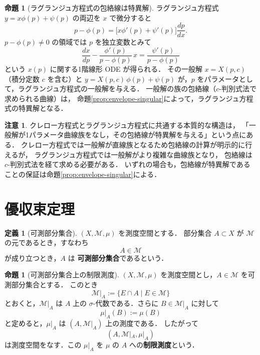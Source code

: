 \documentclass[dvipdfmx,a4paper,12pt]{jsarticle}
\newcommand{\uref}[1]{\hyperref[#1]{\textcolor{TiffanyBlue}{\underline{\ref*{#1}}}}}
\theoremstyle{definition}
\newtheorem{definition}[theorem]{定義}
\newtheorem{proposition}[theorem]{命題}
\newtheorem{remark}[theorem]{注意}
\begin{document}
\begin{proposition}[ラグランジュ方程式の包絡線は特異解]
    ラグランジュ方程式 $y=x\phi(p)+\psi(p)$ の両辺を $x$ で微分すると
    \begin{equation*}
        p - \phi(p) = \bigl[x\phi'(p)+\psi'(p)\bigr]\frac{dp}{dx}.
    \end{equation*}
    $p-\phi(p)\neq 0$ の領域では $p$ を独立変数とみて
    \begin{equation*}
        \frac{dx}{dp} - \frac{\phi'(p)}{p-\phi(p)}\,x = \frac{\psi'(p)}{p-\phi(p)}
    \end{equation*}
    という $x(p)$ に関する1階線形 ODE が得られる．
    その一般解 $x=X(p,c)$（積分定数 $c$ を含む）と
    $y=X(p,c)\,\phi(p)+\psi(p)$ が，$p$ をパラメータとして，ラグランジュ方程式の一般解を与える．
    一般解の族の包絡線（$c$-判別式法で求められる曲線）は，
    命題\uref{prop:envelope-singular}によって，ラグランジュ方程式の特異解となる．
\end{proposition}

\begin{remark}
    クレロー方程式とラグランジュ方程式に共通する本質的な構造は，
    「一般解が1パラメータ曲線族をなし，その包絡線が特異解を与える」という点にある．
    クレロー方程式では一般解が直線族となるため包絡線の計算が明示的に行えるが，
    ラグランジュ方程式では一般解がより複雑な曲線族となり，
    包絡線は $c$-判別式法を経て求める必要がある．
    いずれの場合も，包絡線が特異解であることの保証は命題\uref{prop:envelope-singular}による．
\end{remark}

\section{優収束定理}

\begin{definition}[可測部分集合]
    $(X,\mathcal{M},\mu)$ を測度空間とする．
    部分集合 $A\subset X$ が $\mathcal{M}$ の元であるとき，すなわち
    $$A\in\mathcal{M}$$
    が成り立つとき，$A$ は \textbf{可測部分集合}であるという．
\end{definition}

\begin{proposition}[可測部分集合上の制限測度]
    $(X,\mathcal{M},\mu)$ を測度空間とし，$A\in\mathcal{M}$ を可測部分集合とする．
    このとき
    $$\mathcal{M}|_A:=\{E\cap A\mid E\in\mathcal{M}\}$$
    とおくと，$\mathcal{M}|_A$ は $A$ 上の $\sigma$-代数である．さらに
    $B\in\mathcal{M}|_A$ に対して
    $$\mu|_A(B):=\mu(B)$$
    と定めると，$\mu|_A$ は $(A,\mathcal{M}|_A)$ 上の測度である．
    したがって
    $$(A,\mathcal{M}|_A,\mu|_A)$$
    は測度空間をなす．この $\mu|_A$ を $\mu$ の $A$ への\textbf{制限測度}という．
\end{proposition}
\end{document}

